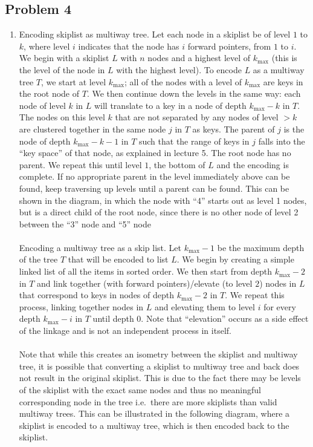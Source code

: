\documentclass{article}
\theoremstyle{casestyle}
\begin{document}
\begin{enumerate}[i]
  \section *{Problem 4}
  \begin{enumerate}[i]
  \item Encoding skiplist as multiway tree. Let each node in a skiplist be of level $1$ to $k$, where level $i$ indicates that the node has $i$ forward pointers, from $1$ to $i$. We begin with a skiplist $L$ with $n$ nodes and a highest level of $k_{\max}$ (this is the level of the node in $L$ with the highest level). To encode $L$ as a multiway tree $T$, we start at level $k_{\max}$; all of the nodes with a level of $k_{\max}$ are keys in the root node of $T$. We then continue down the levels in the same way: each node of level $k$ in $L$ will translate to a key in a node of depth $k_{\max}-k$ in $T$. The nodes on this level $k$ that are not separated by any nodes of level $>k$ are clustered together in the same node $j$ in $T$ as keys. The parent of $j$ is the node of depth $k_{\max}-k-1$ in $T$ such that the range of keys in $j$ falls into the ``key space'' of that node, as explained in lecture 5. The root node has no parent. We repeat this until level $1$, the bottom of $L$ and the encoding is complete. If no appropriate parent in the level immediately above can be found, keep traversing up levels until a parent can be found. This can be shown in the diagram, in which the node with ``4'' starts out as level 1 nodes, but is a direct child of the root node, since there is no other node of level 2 between the ``3'' node and ``5'' node \\\\
    Encoding a multiway tree as a skip list. Let $k_{\max}-1$ be the maximum depth of the tree $T$ that will be encoded to list $L$. We begin by creating a simple linked list of all the items in sorted 
    order. We then start from depth $k_{\max}-2$ in $T$ and link together (with forward pointers)/elevate (to level $2$) nodes in $L$ that correspond to keys in nodes of depth $k_{\max}-2$  in $T$. We repeat this process, linking together nodes in $L$ and elevating them to level $i$ for every depth $k_{\max}-i$ in $T$ until depth $0$. Note that ``elevation'' occurs as a side effect of the linkage and is not an independent process in itself.
    \\\\
    Note that while this creates an isometry between the skiplist and multiway tree, it is possible that converting a skiplist to multiway tree and back does not result in the original skiplist. This is due to the fact there may be levels of the skiplist with the exact same nodes and thus no meaningful corresponding node in the tree i.e.\ there are more skiplists than valid multiway trees. This can be illustrated in the following diagram, where a skiplist is encoded to a multiway tree, which is then encoded back to the skiplist.


\end{enumerate}
\end{enumerate}
\end{document}
